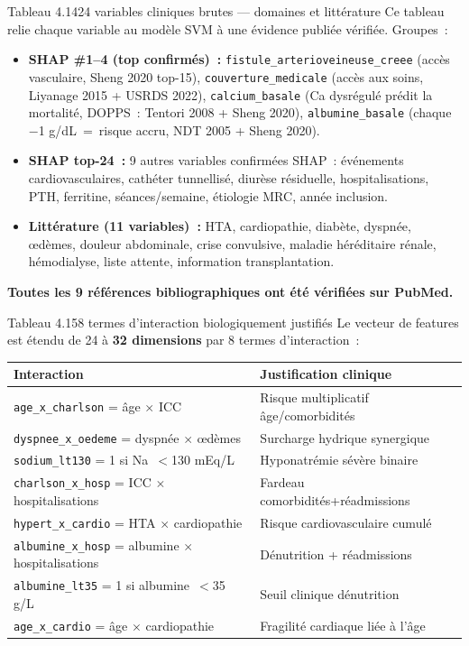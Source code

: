 \documentclass[12pt,a4paper]{article}
\begin{document}
\begin{figbox}{Tableau 4.14}{24 variables cliniques brutes --- domaines et littérature}
Ce tableau relie chaque variable au modèle SVM à une évidence publiée vérifiée.
Groupes~:
\begin{itemize}[leftmargin=1.5em, itemsep=2pt]
  \item \textbf{SHAP \#1--4 (top confirmés)~:} \texttt{fistule\_arterioveineuse\_creee}
    (accès vasculaire, Sheng 2020 top-15), \texttt{couverture\_medicale} (accès aux soins,
    Liyanage 2015 + USRDS 2022), \texttt{calcium\_basale} (Ca dysrégulé prédit
    la mortalité, DOPPS~: Tentori 2008 + Sheng 2020), \texttt{albumine\_basale}
    (chaque $-$1 g/dL~=~risque accru, NDT 2005 + Sheng 2020).
  \item \textbf{SHAP top-24~:} 9 autres variables confirmées SHAP~:
    événements cardiovasculaires, cathéter tunnellisé, diurèse résiduelle,
    hospitalisations, PTH, ferritine, séances/semaine, étiologie MRC, année inclusion.
  \item \textbf{Littérature (11 variables)~:} HTA, cardiopathie, diabète, dyspnée,
    œdèmes, douleur abdominale, crise convulsive, maladie héréditaire rénale,
    hémodialyse, liste attente, information transplantation.
\end{itemize}
\textbf{Toutes les 9 références bibliographiques ont été vérifiées sur PubMed.}
\end{figbox}

\begin{figbox}{Tableau 4.15}{8 termes d'interaction biologiquement justifiés}
Le vecteur de features est étendu de 24 à \textbf{32 dimensions} par 8 termes
d'interaction~:
\begin{center}
\begin{tabular}{ll}
\toprule
\textbf{Interaction} & \textbf{Justification clinique} \\
\midrule
\texttt{age\_x\_charlson} = âge $\times$ ICC & Risque multiplicatif âge/comorbidités\\
\texttt{dyspnee\_x\_oedeme} = dyspnée $\times$ œdèmes & Surcharge hydrique synergique\\
\texttt{sodium\_lt130} = 1 si Na~$<$130 mEq/L & Hyponatrémie sévère binaire\\
\texttt{charlson\_x\_hosp} = ICC $\times$ hospitalisations & Fardeau comorbidités+réadmissions\\
\texttt{hypert\_x\_cardio} = HTA $\times$ cardiopathie & Risque cardiovasculaire cumulé\\
\texttt{albumine\_x\_hosp} = albumine $\times$ hospitalisations & Dénutrition + réadmissions\\
\texttt{albumine\_lt35} = 1 si albumine~$<$35 g/L & Seuil clinique dénutrition\\
\texttt{age\_x\_cardio} = âge $\times$ cardiopathie & Fragilité cardiaque liée à l'âge\\
\bottomrule
\end{tabular}
\end{center}
\end{figbox}
\end{document}
